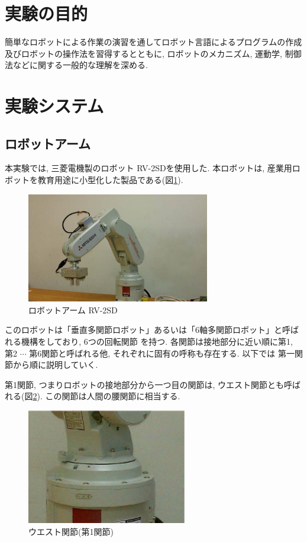 \documentclass[a4paper,11pt]{jsarticle}
\begin{document}
\section{実験の目的}
簡単なロボットによる作業の演習を通してロボット言語によるプログラムの作成及びロボットの操作法を習得するとともに,
ロボットのメカニズム, 運動学, 制御法などに関する一般的な理解を深める.

\section{実験システム}%
\subsection{ロボットアーム}

本実験では,  三菱電機製のロボット RV-2SDを使用した.
本ロボットは, 産業用ロボットを教育用途に小型化した製品である(図\ref{ロボット}).
\begin{figure}[H]
  \begin{center}
    \includegraphics[width = 8cm]{画像/ロボットアーム.png}
    \caption{ロボットアーム RV-2SD}
    \label{ロボット}
  \end{center}
\end{figure}

このロボットは「垂直多関節ロボット」あるいは「6軸多関節ロボット」と呼ばれる機構をしており, 6つの回転関節
を持つ. 各関節は接地部分に近い順に第1, 第2 $\cdots$ 第6関節と呼ばれる他, それぞれに固有の呼称も存在する. 以下では
第一関節から順に説明していく. \par
第1関節, つまりロボットの接地部分から一つ目の関節は, ウエスト関節とも呼ばれる(図\ref{ウエスト関節}).
この関節は人間の腰関節に相当する.
\begin{figure}[H]
  \begin{center}
    \includegraphics[width = 7cm]{画像/ウエスト関節.png}
    \caption{ウエスト関節(第1関節)}
    \label{ウエスト関節}
  \end{center}
\end{figure}
\end{document}
